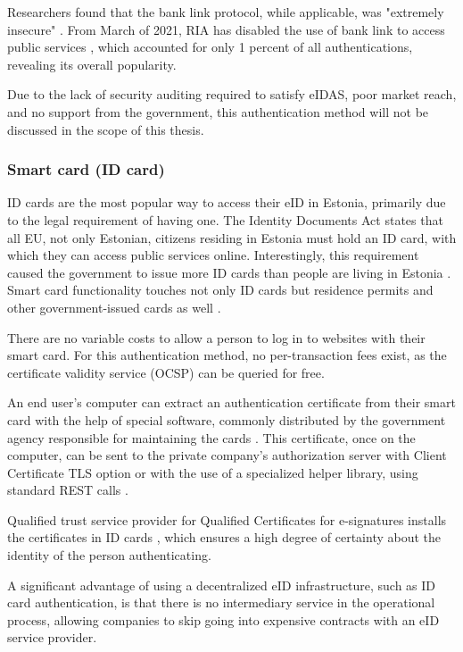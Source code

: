 Researchers found that the bank link protocol, while applicable, was "extremely insecure" \cite{banklinksecurityanalysis}. From March of 2021, RIA has disabled the use of {bank link} to access public services \cite{ria-deprecates-bank-link}, which accounted for only 1 percent of all authentications, revealing its overall popularity.

Due to the lack of security auditing required to satisfy eIDAS, poor market reach, and no support from the government, this authentication method will not be discussed in the scope of this thesis.

\subsubsection{Smart card (ID card)}

ID cards are the most popular way to access their eID in Estonia, primarily due to the legal requirement of having one. The Identity Documents Act \cite{eelaw-idcard} states that all EU, not only Estonian, citizens residing in Estonia must hold an ID card, with which they can access public services online. Interestingly, this requirement caused the government to issue more ID cards than people are living in Estonia \cite{ria-idee,statee-population}. Smart card functionality touches not only ID cards but residence permits and other government-issued cards as well \cite{eulaw-eidas-notified}.

There are no variable costs to allow a person to log in to websites with their smart card. For this authentication method, no per-transaction fees exist, as the certificate validity service (OCSP) \cite{rfc6960} can be queried for free.

An end user's computer can extract an authentication certificate from their smart card with the help of special software, commonly distributed by the government agency responsible for maintaining the cards \cite{ria-idee}. This certificate, once on the computer, can be sent to the private company's authorization server with Client Certificate TLS option \cite{rfc8446} or with the use of a specialized helper library, using standard REST calls \cite{ria-webeid}.

Qualified trust service provider for Qualified Certificates for e-signatures installs the certificates in ID cards \cite{eu-trustservices}, which ensures a high degree of certainty about the identity of the person authenticating.

A significant advantage of using a decentralized eID infrastructure, such as ID card authentication, is that there is no intermediary service in the operational process, allowing companies to skip going into expensive contracts with an eID service provider.

